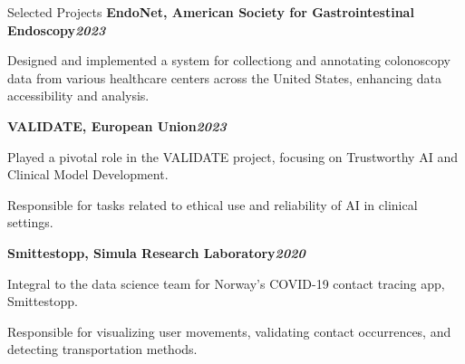\begin{rubric}{Selected Projects}
%
\entry*[]%
\textbf{EndoNet, American Society for Gastrointestinal Endoscopy\hfill\textit{}\hfill\textit{2023}} \par
\begin{compactitem}
    \item Designed and implemented a system for collectiong and annotating colonoscopy data from various healthcare centers across the United States, enhancing data accessibility and analysis.
    \vspace{-12pt}
\end{compactitem}
%
\entry*[]%
\textbf{VALIDATE, European Union\hfill\textit{2023}}
\begin{compactitem}
    \item Played a pivotal role in the VALIDATE project, focusing on Trustworthy AI and Clinical Model Development.
    \item Responsible for tasks related to ethical use and reliability of AI in clinical settings.
    \vspace{-12pt}
\end{compactitem}
%
%
\entry*[]%
\textbf{Smittestopp, Simula Research Laboratory\hfill\textit{2020}} \par
\begin{compactitem}
    \item Integral to the data science team for Norway's COVID-19 contact tracing app, Smittestopp.
    \item Responsible for visualizing user movements, validating contact occurrences, and detecting transportation methods.
    \vspace{-12pt}
\end{compactitem}
%

\end{rubric}
